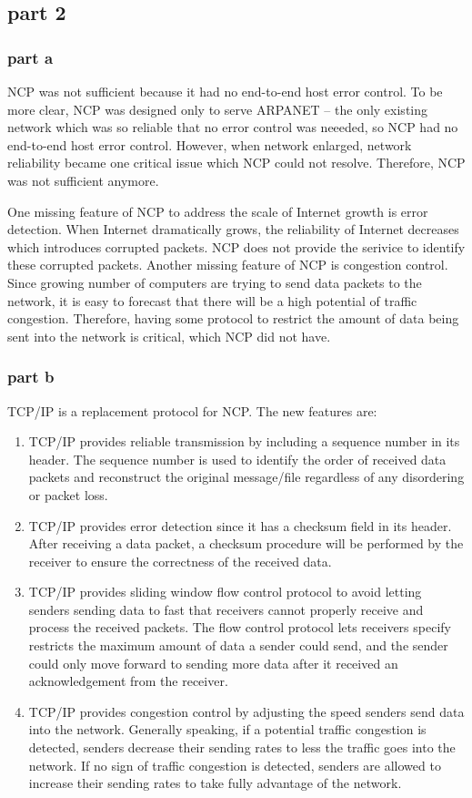 \subsection{part 2}
\subsubsection{part a} NCP was not sufficient because it had no end-to-end host error control. To be more clear, NCP was designed only to serve ARPANET -- the only existing network which was so reliable that no error control was neeeded, so NCP had no end-to-end host error control. However, when network enlarged, network reliability became one critical issue which NCP could not resolve. Therefore, NCP was not sufficient anymore.

One missing feature of NCP to address the scale of Internet growth is error detection. When Internet dramatically grows, the reliability of Internet decreases which introduces corrupted packets. NCP does not provide the serivice to identify these corrupted packets. Another missing feature of NCP is congestion control. Since growing number of computers are trying to send data packets to the network, it is easy to forecast that there will be a high potential of traffic congestion. Therefore, having some protocol to restrict the amount of data being sent into the network is critical, which NCP did not have.
\subsubsection{part b} TCP/IP is a replacement protocol for NCP. The new features are:

\begin{enumerate}
\item TCP/IP provides reliable transmission by including a sequence number in its header. The sequence number is used to identify the order of received data packets and reconstruct the original message/file regardless of any disordering or packet loss.
\item TCP/IP provides error detection since it has a checksum field in its header. After receiving a data packet, a checksum procedure will be performed by the receiver to ensure the correctness of the received data.
\item TCP/IP provides sliding window flow control protocol to avoid letting senders sending data to fast that receivers cannot properly receive and process the received packets. The flow control protocol lets receivers specify restricts the maximum amount of data a sender could send, and the sender could only move forward to sending more data after it received an acknowledgement from the receiver.
\item TCP/IP provides congestion control by adjusting the speed senders send data into the network. Generally speaking, if a potential traffic congestion is detected, senders decrease their sending rates to less the traffic goes into the network. If no sign of traffic congestion is detected, senders are allowed to increase their sending rates to take fully advantage of the network.
\end{enumerate}

